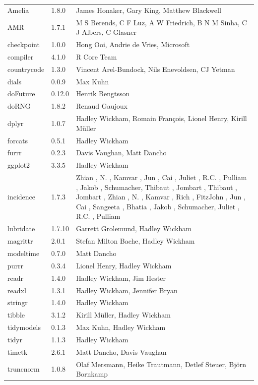 \documentclass[
]{article}
\begin{document}
\begin{landscape}
\begin{longtable}[t]{lll}
\endfoot
\bottomrule
\endlastfoot
Amelia & 1.8.0 & James Honaker, Gary King, Matthew Blackwell\\
AMR & 1.7.1 & M S Berends, C F Luz, A W Friedrich, B N M Sinha, C J Albers, C Glasner\\
checkpoint & 1.0.0 & Hong Ooi, Andrie de Vries, Microsoft\\
compiler & 4.1.0 & R Core Team\\
countrycode & 1.3.0 & Vincent Arel-Bundock, Nils Enevoldsen, CJ Yetman\\
\addlinespace
dials & 0.0.9 & Max Kuhn\\
doFuture & 0.12.0 & Henrik Bengtsson\\
doRNG & 1.8.2 & Renaud Gaujoux\\
dplyr & 1.0.7 & Hadley Wickham, Romain François, Lionel Henry, Kirill Müller\\
forcats & 0.5.1 & Hadley Wickham\\
\addlinespace
furrr & 0.2.3 & Davis Vaughan, Matt Dancho\\
ggplot2 & 3.3.5 & Hadley Wickham\\
incidence & 1.7.3 & Zhian     , N.        , Kamvar    , Jun       , Cai       , Juliet    , R.C.      , Pulliam   , Jakob     , Schumacher, Thibaut   , Jombart   , Thibaut   , Jombart   , Zhian     , N.        , Kamvar    , Rich      , FitzJohn  , Jun       , Cai       , Sangeeta  , Bhatia    , Jakob     , Schumacher, Juliet    , R.C.      , Pulliam\\
lubridate & 1.7.10 & Garrett Grolemund, Hadley Wickham\\
magrittr & 2.0.1 & Stefan Milton Bache, Hadley Wickham\\
\addlinespace
modeltime & 0.7.0 & Matt Dancho\\
purrr & 0.3.4 & Lionel Henry, Hadley Wickham\\
readr & 1.4.0 & Hadley Wickham, Jim Hester\\
readxl & 1.3.1 & Hadley Wickham, Jennifer Bryan\\
stringr & 1.4.0 & Hadley Wickham\\
\addlinespace
tibble & 3.1.2 & Kirill Müller, Hadley Wickham\\
tidymodels & 0.1.3 & Max Kuhn, Hadley Wickham\\
tidyr & 1.1.3 & Hadley Wickham\\
timetk & 2.6.1 & Matt Dancho, Davis Vaughan\\
truncnorm & 1.0.8 & Olaf Mersmann, Heike Trautmann, Detlef Steuer, Björn Bornkamp\\

\end{longtable}
\end{landscape}
\end{document}
